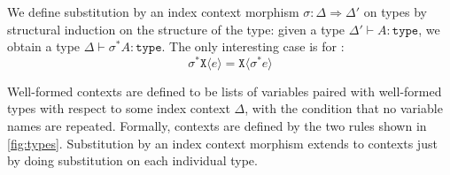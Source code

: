 \documentclass[natbib,preprint]{sigplanconf}
\newcommand{\sortType}{\texttt{type}}
\newcommand{\tyPrim}[2]{\texttt{#1}\langle #2 \rangle}
\begin{document}
We define substitution by an index context morphism $\sigma : \Delta
\Rightarrow \Delta'$ on types by structural induction on the structure
of the type: given a type $\Delta' \vdash A : \sortType$, we obtain a
type $\Delta \vdash \sigma^*A : \sortType$. The only interesting case
is for :
\begin{displaymath}
  \sigma^*\tyPrim{X}{e} = \tyPrim{X}{\sigma^*e}
\end{displaymath}

Well-formed contexts are defined to be lists of variables paired with
well-formed types with respect to some index context $\Delta$, with
the condition that no variable names are repeated. Formally, contexts
are defined by the two rules shown in
\autoref{fig:types}. Substitution by an index context morphism extends
to contexts just by doing substitution on each individual type.
\end{document}
